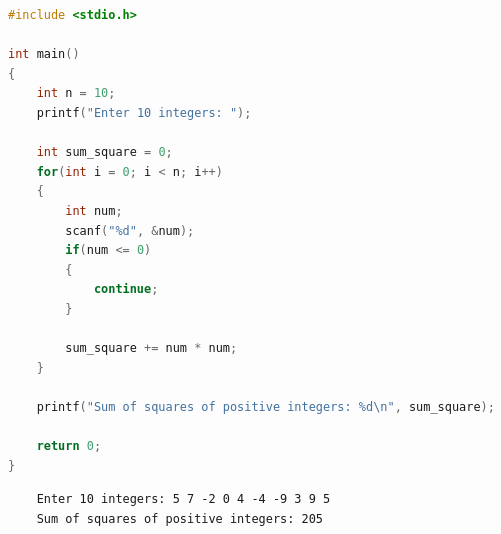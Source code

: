 
\begin{lstlisting}[language=C]
#include <stdio.h>

int main()
{
    int n = 10;
    printf("Enter 10 integers: ");

    int sum_square = 0;
    for(int i = 0; i < n; i++)
    {
        int num;
        scanf("%d", &num);
        if(num <= 0)
        {
            continue;
        }

        sum_square += num * num;
    }

    printf("Sum of squares of positive integers: %d\n", sum_square);

    return 0;
}
\end{lstlisting}

\begin{tcolorbox}
    \begin{verbatim}
    Enter 10 integers: 5 7 -2 0 4 -4 -9 3 9 5
    Sum of squares of positive integers: 205
\end{verbatim}
\end{tcolorbox}

\newpage